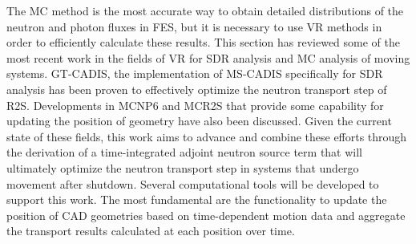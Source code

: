 The MC method is the most accurate way to obtain detailed distributions of the
neutron and photon fluxes in FES, but it is necessary to use VR methods in
order to efficiently calculate these results.
This section has reviewed some of the most recent work in the fields of VR for SDR analysis 
and MC analysis of moving systems.
GT-CADIS, the implementation of MS-CADIS specifically for SDR analysis has been
proven to effectively optimize the neutron transport step of R2S.
Developments in MCNP6 and MCR2S that provide some capability for updating the
position of geometry have also been discussed.
Given the current state of these fields, this work aims to advance and combine
these efforts through the derivation of a
time-integrated adjoint 
neutron source term that will ultimately optimize the neutron
transport step in systems that undergo movement after shutdown.  
Several computational tools will be developed to support this work. The most
fundamental are the functionality to update the
position of CAD geometries based on time-dependent motion data and aggregate
the transport results calculated at each position over time. 
